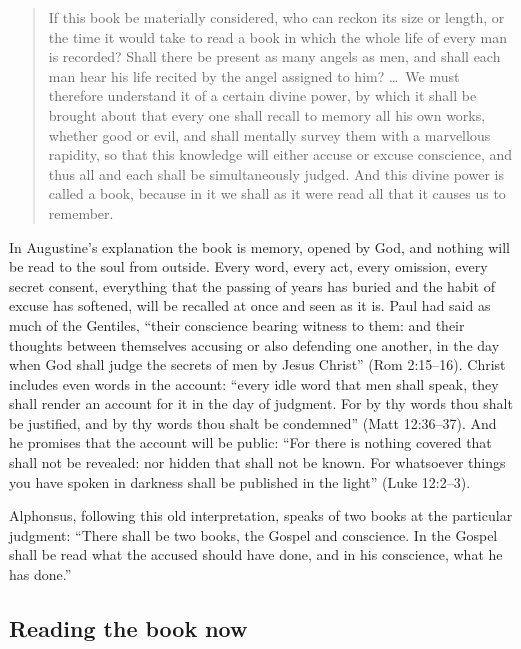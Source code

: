 \begin{quote}
If this book be materially considered, who can reckon its size or length, or the time it would take to read a book in which the whole life of every man is recorded? Shall there be present as many angels as men, and shall each man hear his life recited by the angel assigned to him? \ldots\ We must therefore understand it of a certain divine power, by which it shall be brought about that every one shall recall to memory all his own works, whether good or evil, and shall mentally survey them with a marvellous rapidity, so that this knowledge will either accuse or excuse conscience, and thus all and each shall be simultaneously judged. And this divine power is called a book, because in it we shall as it were read all that it causes us to remember.
\end{quote}

In Augustine's explanation the book is memory, opened by God, and nothing will be read to the soul from outside. Every word, every act, every omission, every secret consent, everything that the passing of years has buried and the habit of excuse has softened, will be recalled at once and seen as it is. Paul had said as much of the Gentiles, ``their conscience bearing witness to them: and their thoughts between themselves accusing or also defending one another, in the day when God shall judge the secrets of men by Jesus Christ'' (Rom 2:15--16). Christ includes even words in the account: ``every idle word that men shall speak, they shall render an account for it in the day of judgment. For by thy words thou shalt be justified, and by thy words thou shalt be condemned'' (Matt 12:36--37). And he promises that the account will be public: ``For there is nothing covered that shall not be revealed: nor hidden that shall not be known. For whatsoever things you have spoken in darkness shall be published in the light'' (Luke 12:2--3).

Alphonsus, following this old interpretation, speaks of two books at the particular judgment: ``There shall be two books, the Gospel and conscience. In the Gospel shall be read what the accused should have done, and in his conscience, what he has done.''

\subsection{Reading the book now}

